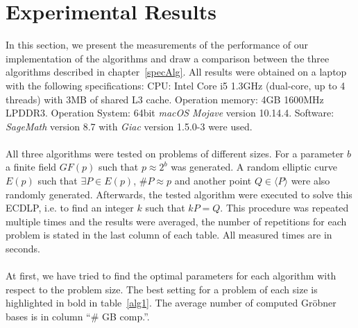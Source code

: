 \documentclass[thesis=M,english]{FITthesis}[2012/10/20]
\theoremstyle{remark}
\theoremstyle{definition}
\begin{document}
\section{Experimental Results}
\label{expResults}
In this section, we present the measurements of the performance of our implementation of the algorithms and draw a comparison between the three algorithms described in chapter~\ref{specAlg}. All results were obtained on a laptop with the following specifications:  CPU: Intel Core i5 1.3GHz (dual-core, up to 4 threads) with 3MB of shared L3 cache. Operation memory: 4GB 1600MHz LPDDR3. Operation System: 64bit \textit{macOS Mojave} version 10.14.4. Software: \textit{SageMath} version 8.7 with \textit{Giac} version 1.5.0-3 were used. 
\\ \\
\noindent All three algorithms were tested on problems of different sizes. For a parameter $b$ a finite field $GF(p)$ such that $p \approx 2^b$ was generated. A random elliptic curve $E(p)$ such that $\exists P \in E(p)$, $\#P \approx p$ and another point $Q \in \langle P \rangle$ were also randomly generated. Afterwards, the tested algorithm were executed to solve this ECDLP, i.e. to find an integer $k$ such that $kP = Q$. This procedure was repeated multiple times and the results were averaged, the number of repetitions for each problem is stated in the last column of each table. All measured times are in seconds. \\ \\ 
\noindent At first, we have tried to find the optimal parameters for each algorithm with respect to the problem size. The best setting for a problem of each size is highlighted in bold in table~\ref{alg1}. The average number of computed Gröbner bases is in column \enquote{\# GB comp.}.  \newpage
\end{document}
